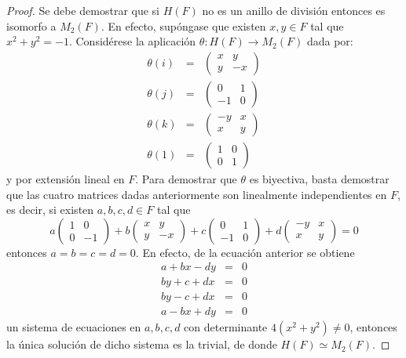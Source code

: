 \begin{proof}
Se debe demostrar que si $H(F)$ no es un anillo de división entonces es isomorfo a $M_2(F)$. En efecto, supóngase que existen $x,y \in F$ tal que $x^2 + y^2 = -1$. Considérese la aplicación $\theta \colon H(F) \to M_2(F)$ dada por:
\begin{eqnarray*}
\theta(i) &=& \begin{pmatrix}
x & y\\
y & -x
\end{pmatrix}\\
\theta(j) &=& \begin{pmatrix}
0 & 1\\
-1 & 0
\end{pmatrix}\\
\theta(k) &=& \begin{pmatrix}
-y & x \\
x & y 
\end{pmatrix} \\
\theta(1) &=& \begin{pmatrix}
1 & 0 \\
0 & 1
\end{pmatrix}
\end{eqnarray*}
y por extensión lineal en $F$.
Para demostrar que $\theta$ es biyectiva, basta demostrar que las cuatro matrices dadas anteriormente son linealmente independientes en $F$, es decir, si existen $a, b, c, d \in F$ tal que 
\begin{equation*}
a\begin{pmatrix}
1 & 0\\
0 & -1
\end{pmatrix} + b\begin{pmatrix}
x & y \\
y & -x
\end{pmatrix} + c\begin{pmatrix}
0 & 1 \\
-1 & 0
\end{pmatrix} + d\begin{pmatrix}
-y & x\\
x & y
\end{pmatrix} = 0
\end{equation*}
entonces $a = b = c = d = 0$. En efecto, de la ecuación anterior se obtiene
\begin{eqnarray*}
a + bx - dy &=& 0\\
by + c + dx &=& 0 \\
by -c + dx &=& 0 \\
a -bx + dy &=& 0
\end{eqnarray*}
un sistema de ecuaciones en $a, b, c,d$ con determinante $4(x^2 + y^2) \neq 0$, entonces la única solución de dicho sistema es la trivial, de donde $H(F) \simeq M_2(F)$.
\end{proof}

